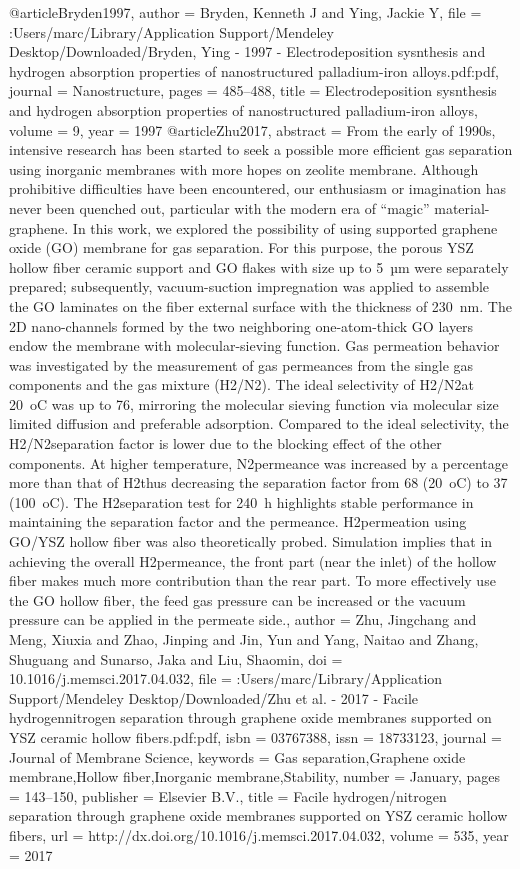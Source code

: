 @article{Bryden1997,
author = {Bryden, Kenneth J and Ying, Jackie Y},
file = {:Users/marc/Library/Application Support/Mendeley Desktop/Downloaded/Bryden, Ying - 1997 - Electrodeposition sysnthesis and hydrogen absorption properties of nanostructured palladium-iron alloys.pdf:pdf},
journal = {Nanostructure},
pages = {485--488},
title = {{Electrodeposition sysnthesis and hydrogen absorption properties of nanostructured palladium-iron alloys}},
volume = {9},
year = {1997}
}
@article{Zhu2017,
abstract = {From the early of 1990s, intensive research has been started to seek a possible more efficient gas separation using inorganic membranes with more hopes on zeolite membrane. Although prohibitive difficulties have been encountered, our enthusiasm or imagination has never been quenched out, particular with the modern era of “magic” material-graphene. In this work, we explored the possibility of using supported graphene oxide (GO) membrane for gas separation. For this purpose, the porous YSZ hollow fiber ceramic support and GO flakes with size up to 5 µm were separately prepared; subsequently, vacuum-suction impregnation was applied to assemble the GO laminates on the fiber external surface with the thickness of 230 nm. The 2D nano-channels formed by the two neighboring one-atom-thick GO layers endow the membrane with molecular-sieving function. Gas permeation behavior was investigated by the measurement of gas permeances from the single gas components and the gas mixture (H2/N2). The ideal selectivity of H2/N2at 20 oC was up to 76, mirroring the molecular sieving function via molecular size limited diffusion and preferable adsorption. Compared to the ideal selectivity, the H2/N2separation factor is lower due to the blocking effect of the other components. At higher temperature, N2permeance was increased by a percentage more than that of H2thus decreasing the separation factor from 68 (20 oC) to 37 (100 oC). The H2separation test for 240 h highlights stable performance in maintaining the separation factor and the permeance. H2permeation using GO/YSZ hollow fiber was also theoretically probed. Simulation implies that in achieving the overall H2permeance, the front part (near the inlet) of the hollow fiber makes much more contribution than the rear part. To more effectively use the GO hollow fiber, the feed gas pressure can be increased or the vacuum pressure can be applied in the permeate side.},
author = {Zhu, Jingchang and Meng, Xiuxia and Zhao, Jinping and Jin, Yun and Yang, Naitao and Zhang, Shuguang and Sunarso, Jaka and Liu, Shaomin},
doi = {10.1016/j.memsci.2017.04.032},
file = {:Users/marc/Library/Application Support/Mendeley Desktop/Downloaded/Zhu et al. - 2017 - Facile hydrogennitrogen separation through graphene oxide membranes supported on YSZ ceramic hollow fibers.pdf:pdf},
isbn = {03767388},
issn = {18733123},
journal = {Journal of Membrane Science},
keywords = {Gas separation,Graphene oxide membrane,Hollow fiber,Inorganic membrane,Stability},
number = {January},
pages = {143--150},
publisher = {Elsevier B.V.},
title = {{Facile hydrogen/nitrogen separation through graphene oxide membranes supported on YSZ ceramic hollow fibers}},
url = {http://dx.doi.org/10.1016/j.memsci.2017.04.032},
volume = {535},
year = {2017}
}
